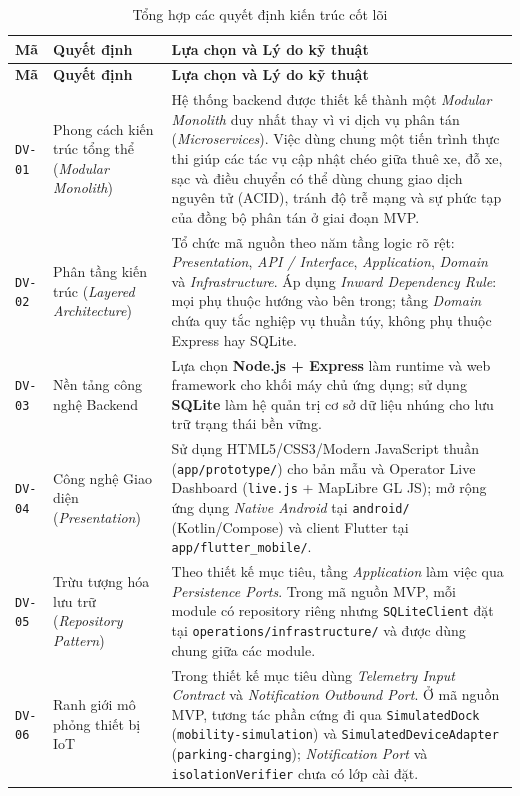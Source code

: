 \begin{longtable}{>{\centering\arraybackslash}p{1.6cm} >{\raggedright\arraybackslash}p{4.1cm} >{\raggedright\arraybackslash}p{8.6cm}}
\caption{Tổng hợp các quyết định kiến trúc cốt lõi} \label{tab:arch-decisions} \\
\toprule
\textbf{Mã} & \textbf{Quyết định} & \textbf{Lựa chọn và Lý do kỹ thuật} \\
\midrule
\endfirsthead
\toprule
\textbf{Mã} & \textbf{Quyết định} & \textbf{Lựa chọn và Lý do kỹ thuật} \\
\midrule
\endhead
\bottomrule
\endfoot
\texttt{DV-01} & Phong cách kiến trúc tổng thể (\textit{Modular Monolith}) & Hệ thống backend được thiết kế thành một \textit{Modular Monolith} duy nhất thay vì vi dịch vụ phân tán (\textit{Microservices}). Việc dùng chung một tiến trình thực thi giúp các tác vụ cập nhật chéo giữa thuê xe, đỗ xe, sạc và điều chuyển có thể dùng chung giao dịch nguyên tử (ACID), tránh độ trễ mạng và sự phức tạp của đồng bộ phân tán ở giai đoạn MVP. \\
\midrule
\texttt{DV-02} & Phân tầng kiến trúc (\textit{Layered Architecture}) & Tổ chức mã nguồn theo năm tầng logic rõ rệt: \textit{Presentation}, \textit{API / Interface}, \textit{Application}, \textit{Domain} và \textit{Infrastructure}. Áp dụng \textit{Inward Dependency Rule}: mọi phụ thuộc hướng vào bên trong; tầng \textit{Domain} chứa quy tắc nghiệp vụ thuần túy, không phụ thuộc Express hay SQLite. \\
\midrule
\texttt{DV-03} & Nền tảng công nghệ Backend & Lựa chọn \textbf{Node.js + Express} làm runtime và web framework cho khối máy chủ ứng dụng; sử dụng \textbf{SQLite} làm hệ quản trị cơ sở dữ liệu nhúng cho lưu trữ trạng thái bền vững. \\
\midrule
\texttt{DV-04} & Công nghệ Giao diện (\textit{Presentation}) & Sử dụng HTML5/CSS3/Modern JavaScript thuần (\texttt{app/prototype/}) cho bản mẫu và Operator Live Dashboard (\texttt{live.js} + MapLibre GL JS); mở rộng ứng dụng \textit{Native Android} tại \texttt{android/} (Kotlin/Compose) và client Flutter tại \texttt{app/flutter\_mobile/}. \\
\midrule
\texttt{DV-05} & Trừu tượng hóa lưu trữ (\textit{Repository Pattern}) & Theo thiết kế mục tiêu, tầng \textit{Application} làm việc qua \textit{Persistence Ports}. Trong mã nguồn MVP, mỗi module có repository riêng nhưng \texttt{SQLiteClient} đặt tại \texttt{operations/infrastructure/} và được dùng chung giữa các module. \\
\midrule
\texttt{DV-06} & Ranh giới mô phỏng thiết bị IoT & Trong thiết kế mục tiêu dùng \textit{Telemetry Input Contract} và \textit{Notification Outbound Port}. Ở mã nguồn MVP, tương tác phần cứng đi qua \texttt{SimulatedDock} (\texttt{mobility-simulation}) và \texttt{SimulatedDeviceAdapter} (\texttt{parking-charging}); \textit{Notification Port} và \texttt{isolationVerifier} chưa có lớp cài đặt. \\

\end{longtable}
